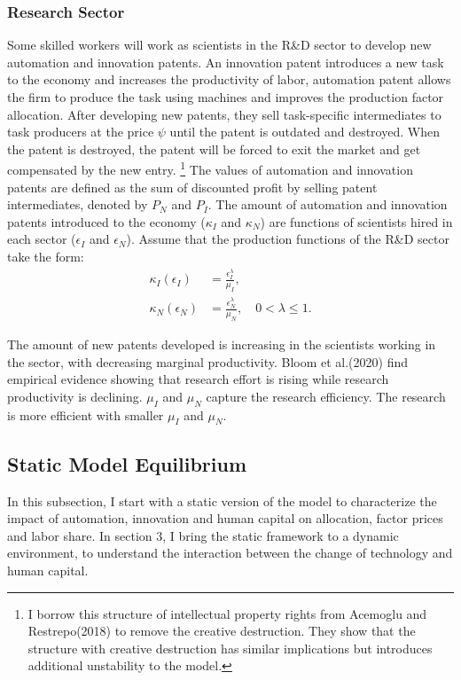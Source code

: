 \documentclass[12pt]{article}
\begin{document}
\subsubsection*{Research Sector}
Some skilled workers will work as scientists in the R\&D sector to develop new automation and innovation patents. An innovation patent introduces a new task to the economy and increases the productivity of labor, automation patent allows the firm to produce the task using machines and improves the production factor allocation. After developing new patents, they sell task-specific intermediates to task producers at the price $\psi$ until the patent is outdated and destroyed. When the patent is destroyed, the patent will be forced to exit the market and get compensated by the new entry. \footnote{I borrow this structure of intellectual property rights from Acemoglu and Restrepo(2018)\nocite{AcemogluRestrepo2018} to remove the creative destruction. They show that the structure with creative destruction has similar implications but introduces additional unstability to the model.} The values of automation and innovation patents are defined as the sum of discounted profit by selling patent intermediates, denoted by $P_N$ and $P_I$. The amount of automation and innovation patents introduced to the economy ($\kappa_I$ and $\kappa_N$) are functions of scientists hired in each sector ($\epsilon_I$ and $\epsilon_N$).
Assume that the production functions of the R\&D sector take the form: 
\begin{align}
\label{kappa_I}
\kappa_I(\epsilon_I) &= \frac{\epsilon_I^\lambda}{\mu_I}, \\
\label{kappa_N}
\kappa_N(\epsilon_N) &= \frac{\epsilon_N^\lambda}{\mu_N}, \quad 0<\lambda\leq 1.
\end{align}

The amount of new patents developed is increasing in the scientists working in the sector, with decreasing marginal productivity. Bloom et al.(2020)\nocite{Bloometal2020} find empirical evidence showing that research effort is rising while research productivity is declining. $\mu_I$ and $\mu_N$ capture the research efficiency. The research is more efficient with smaller $\mu_I$ and $\mu_N$. 

\subsection{Static Model Equilibrium}
In this subsection, I start with a static version of the model to characterize the impact of automation, innovation and human capital on allocation, factor prices and labor share. In section 3, I bring the static framework to a dynamic environment, to understand the interaction between the change of technology and human capital. 
\end{document}
